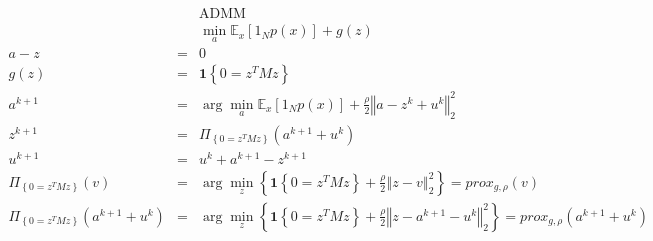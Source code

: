 \documentclass{article}
\begin{document}
\begin{eqnarray*}
&&\text{ADMM} \\
&&\min_{a}\mathbb{E}_{x}\left[ 1_{N}p\left( x\right) \right] +g\left(
z\right) \\
a-z &=&0 \\
g\left( z\right) &=&\mathbf{1}\left\{ 0=z^{T}Mz\right\} \\
a^{k+1} &=&\arg \min_{a}\mathbb{E}_{x}\left[ 1_{N}p\left( x\right) \right] +%
\frac{\rho }{2}\left\Vert a-z^{k}+u^{k}\right\Vert _{2}^{2} \\
z^{k+1} &=&\Pi _{\left\{ 0=z^{T}Mz\right\} }\left( a^{k+1}+u^{k}\right) \\
u^{k+1} &=&u^{k}+a^{k+1}-z^{k+1} \\
\Pi _{\left\{ 0=z^{T}Mz\right\} }\left( v\right) &=&\arg \min_{z}\left\{ 
\mathbf{1}\left\{ 0=z^{T}Mz\right\} +\frac{\rho }{2}\left\Vert
z-v\right\Vert _{2}^{2}\right\} =prox_{g,\rho }\left( v\right) \\
\Pi _{\left\{ 0=z^{T}Mz\right\} }\left( a^{k+1}+u^{k}\right) &=&\arg
\min_{z}\left\{ \mathbf{1}\left\{ 0=z^{T}Mz\right\} +\frac{\rho }{2}%
\left\Vert z-a^{k+1}-u^{k}\right\Vert _{2}^{2}\right\} =prox_{g,\rho }\left(
a^{k+1}+u^{k}\right)
\end{eqnarray*}
\end{document}
